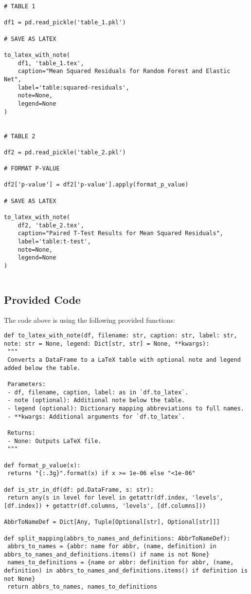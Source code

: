 \documentclass[11pt]{article}
\begin{document}
\begin{verbatim}
# TABLE 1

df1 = pd.read_pickle('table_1.pkl')

# SAVE AS LATEX

to_latex_with_note(
    df1, 'table_1.tex',
    caption="Mean Squared Residuals for Random Forest and Elastic Net",
    label='table:squared-residuals',
    note=None,
    legend=None
)


# TABLE 2

df2 = pd.read_pickle('table_2.pkl')

# FORMAT P-VALUE

df2['p-value'] = df2['p-value'].apply(format_p_value)

# SAVE AS LATEX

to_latex_with_note(
    df2, 'table_2.tex',
    caption="Paired T-Test Results for Mean Squared Residuals",
    label='table:t-test',
    note=None,
    legend=None
)


\end{verbatim}

\subsection{Provided Code}
The code above is using the following provided functions:

\begin{verbatim}
def to_latex_with_note(df, filename: str, caption: str, label: str, note: str = None, legend: Dict[str, str] = None, **kwargs):
 """
 Converts a DataFrame to a LaTeX table with optional note and legend added below the table.

 Parameters:
 - df, filename, caption, label: as in `df.to_latex`.
 - note (optional): Additional note below the table.
 - legend (optional): Dictionary mapping abbreviations to full names.
 - **kwargs: Additional arguments for `df.to_latex`.

 Returns:
 - None: Outputs LaTeX file.
 """

def format_p_value(x):
 returns "{:.3g}".format(x) if x >= 1e-06 else "<1e-06"

def is_str_in_df(df: pd.DataFrame, s: str):
 return any(s in level for level in getattr(df.index, 'levels', [df.index]) + getattr(df.columns, 'levels', [df.columns]))

AbbrToNameDef = Dict[Any, Tuple[Optional[str], Optional[str]]]

def split_mapping(abbrs_to_names_and_definitions: AbbrToNameDef):
 abbrs_to_names = {abbr: name for abbr, (name, definition) in abbrs_to_names_and_definitions.items() if name is not None}
 names_to_definitions = {name or abbr: definition for abbr, (name, definition) in abbrs_to_names_and_definitions.items() if definition is not None}
 return abbrs_to_names, names_to_definitions

\end{verbatim}
\end{document}
